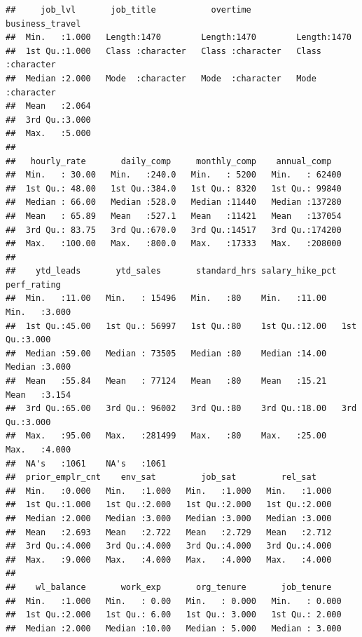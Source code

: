 \documentclass[
]{book}
\begin{document}
\begin{verbatim}
##     job_lvl       job_title           overtime         business_travel   
##  Min.   :1.000   Length:1470        Length:1470        Length:1470       
##  1st Qu.:1.000   Class :character   Class :character   Class :character  
##  Median :2.000   Mode  :character   Mode  :character   Mode  :character  
##  Mean   :2.064                                                           
##  3rd Qu.:3.000                                                           
##  Max.   :5.000                                                           
##                                                                          
##   hourly_rate       daily_comp     monthly_comp    annual_comp    
##  Min.   : 30.00   Min.   :240.0   Min.   : 5200   Min.   : 62400  
##  1st Qu.: 48.00   1st Qu.:384.0   1st Qu.: 8320   1st Qu.: 99840  
##  Median : 66.00   Median :528.0   Median :11440   Median :137280  
##  Mean   : 65.89   Mean   :527.1   Mean   :11421   Mean   :137054  
##  3rd Qu.: 83.75   3rd Qu.:670.0   3rd Qu.:14517   3rd Qu.:174200  
##  Max.   :100.00   Max.   :800.0   Max.   :17333   Max.   :208000  
##                                                                   
##    ytd_leads       ytd_sales       standard_hrs salary_hike_pct  perf_rating   
##  Min.   :11.00   Min.   : 15496   Min.   :80    Min.   :11.00   Min.   :3.000  
##  1st Qu.:45.00   1st Qu.: 56997   1st Qu.:80    1st Qu.:12.00   1st Qu.:3.000  
##  Median :59.00   Median : 73505   Median :80    Median :14.00   Median :3.000  
##  Mean   :55.84   Mean   : 77124   Mean   :80    Mean   :15.21   Mean   :3.154  
##  3rd Qu.:65.00   3rd Qu.: 96002   3rd Qu.:80    3rd Qu.:18.00   3rd Qu.:3.000  
##  Max.   :95.00   Max.   :281499   Max.   :80    Max.   :25.00   Max.   :4.000  
##  NA's   :1061    NA's   :1061                                                  
##  prior_emplr_cnt    env_sat         job_sat         rel_sat     
##  Min.   :0.000   Min.   :1.000   Min.   :1.000   Min.   :1.000  
##  1st Qu.:1.000   1st Qu.:2.000   1st Qu.:2.000   1st Qu.:2.000  
##  Median :2.000   Median :3.000   Median :3.000   Median :3.000  
##  Mean   :2.693   Mean   :2.722   Mean   :2.729   Mean   :2.712  
##  3rd Qu.:4.000   3rd Qu.:4.000   3rd Qu.:4.000   3rd Qu.:4.000  
##  Max.   :9.000   Max.   :4.000   Max.   :4.000   Max.   :4.000  
##                                                                 
##    wl_balance       work_exp       org_tenure       job_tenure    
##  Min.   :1.000   Min.   : 0.00   Min.   : 0.000   Min.   : 0.000  
##  1st Qu.:2.000   1st Qu.: 6.00   1st Qu.: 3.000   1st Qu.: 2.000  
##  Median :2.000   Median :10.00   Median : 5.000   Median : 3.000  

\end{verbatim}
\end{document}
